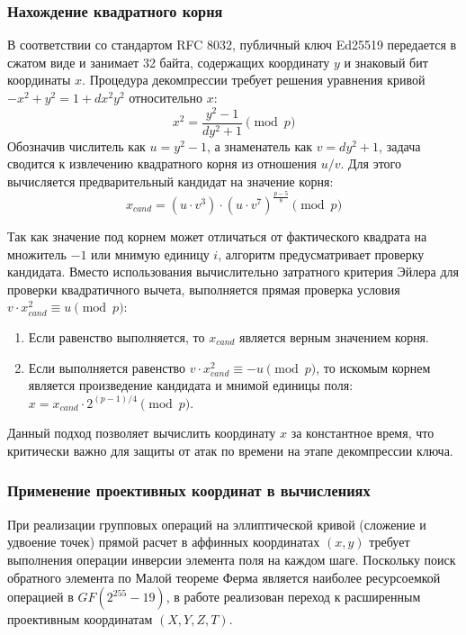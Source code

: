 \subsubsection{Нахождение квадратного корня}

В соответствии со стандартом RFC 8032, публичный ключ Ed25519 передается в сжатом виде и занимает 32 байта, содержащих координату $y$ и знаковый бит координаты $x$. Процедура декомпрессии требует решения уравнения кривой $-x^2 + y^2 = 1 + dx^2y^2$ относительно $x$:
\begin{equation}
    x^2 = \frac{y^2 - 1}{dy^2 + 1} \pmod p
\end{equation}
Обозначив числитель как $u = y^2 - 1$, а знаменатель как $v = dy^2 + 1$, задача сводится к извлечению квадратного корня из отношения $u/v$. Для этого вычисляется предварительный кандидат на значение корня:
\begin{equation}
    x_{cand} = (u \cdot v^3) \cdot (u \cdot v^7)^{\frac{p-5}{8}} \pmod p
\end{equation}

Так как значение под корнем может отличаться от фактического квадрата на множитель $-1$ или мнимую единицу $i$, алгоритм предусматривает проверку кандидата. Вместо использования вычислительно затратного критерия Эйлера для проверки квадратичного вычета, выполняется прямая проверка условия $v \cdot x_{cand}^2 \equiv u \pmod p$:
\begin{enumerate}
    \item Если равенство выполняется, то $x_{cand}$ является верным значением корня.
    \item Если выполняется равенство $v \cdot x_{cand}^2 \equiv -u \pmod p$, то искомым корнем является произведение кандидата и мнимой единицы поля: $x = x_{cand} \cdot 2^{(p-1)/4} \pmod p$.
\end{enumerate}
Данный подход позволяет вычислить координату $x$ за константное время, что критически важно для защиты от атак по времени на этапе декомпрессии ключа.

\subsubsection{Применение проективных координат в вычислениях}

При реализации групповых операций на эллиптической кривой (сложение и удвоение точек) прямой расчет в аффинных координатах $(x, y)$ требует выполнения операции инверсии элемента поля на каждом шаге. Поскольку поиск обратного элемента по Малой теореме Ферма является наиболее ресурсоемкой операцией в $GF(2^{255}-19)$, в работе реализован переход к расширенным проективным координатам $(X, Y, Z, T)$.

